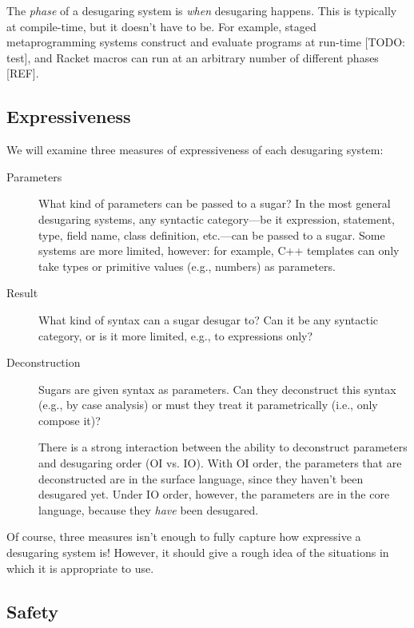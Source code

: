 The \emph{phase} of a desugaring system is \emph{when} desugaring
happens. This is typically at compile-time, but it doesn't have to be.
For example, staged metaprogramming systems construct and evaluate
programs at run-time [TODO: test], and Racket macros can run at an
arbitrary number of different phases [REF].

\subsection{Expressiveness}

We will examine three measures of expressiveness of each desugaring
system:
\begin{description}
\item[Parameters] What kind of parameters can be passed to a sugar? In
  the most general desugaring systems, any syntactic category---be it
  expression, statement, type, field name, class definition,
  etc.---can be passed to a sugar. Some systems are more limited,
  however: for example, C++ templates can only take types or primitive
  values (e.g., numbers) as parameters.
\item[Result] What kind of syntax can a sugar desugar to? Can it be
  any syntactic category, or is it more limited, e.g., to expressions
  only?
\item[Deconstruction] Sugars are given syntax as parameters. Can they
  deconstruct this syntax (e.g., by case analysis) or must
  they treat it parametrically (i.e., only compose it)?

  There is a strong interaction between the ability to deconstruct
  parameters and desugaring order (OI vs. IO). With OI order, the
  parameters that are deconstructed are in the surface language, since
  they haven't been desugared yet. Under IO order, however, the
  parameters are in the core language, because they \emph{have} been
  desugared.
\end{description}
Of course, three measures isn't enough to fully capture how expressive
a desugaring system is! However, it should give a rough idea of the
situations in which it is appropriate to use.


\subsection{Safety}

